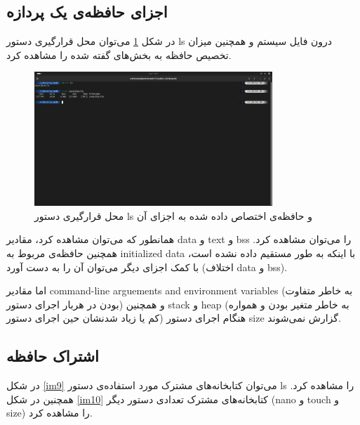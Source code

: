 \documentclass[12pt]{article}
\begin{document}
        \subsection{اجزای حافظه‌ی یک پردازه}

        در شکل 
        \ref{im8}
        می‌توان محل قرارگیری دستور
        \textenglish{ls}
        درون فایل سیستم و همچنین میزان تخصیص حافظه به بخش‌های گفته شده را مشاهده کرد.

        \begin{figure}[H]
		\centering
		\includegraphics[width=0.8\textwidth]{report6-resources/8.png}
		\caption{محل قرارگیری دستور \textenglish{ls} و حافظه‌ی اختصاص داده شده به اجزای آن}
            \label{im8}
	\end{figure}

        همانطور که می‌توان مشاهده کرد، مقادیر
        \textenglish{data}
        و 
        \textenglish{text}
        و
        \textenglish{bss}
        را می‌توان مشاهده کرد. همچنین حافظه‌ی مربوط به 
        \textenglish{initialized data}
        با اینکه به طور مستقیم داده نشده است، با کمک اجزای دیگر می‌توان آن را به دست آورد (اختلاف
        \textenglish{data}
        و 
        \textenglish{bss}).

        اما مقادیر
        \textenglish{command-line arguements and environment variables}
        (به خاطر متفاوت بودن در هربار اجرای دستور)
        و همچنین 
        \textenglish{stack}
        و
        \textenglish{heap}
        (به خاطر متغیر بودن و همواره کم یا زیاد شدنشان حین اجرای دستور)
        هنگام اجرای دستور
        \textenglish{size}
        گزارش نمی‌شوند.

        \subsection{اشتراک حافظه}

        در شکل 
        \ref{im9}
        می‌توان کتابخانه‌های مشترک مورد استفاده‌ی دستور
        \textenglish{ls}
        را مشاهده کرد. همچنین در شکل
        \ref{im10}
        کتابخانه‌های مشترک تعدادی دستور دیگر (\textenglish{nano} و \textenglish{touch} و \textenglish{size}) را مشاهده کرد.
\end{document}
